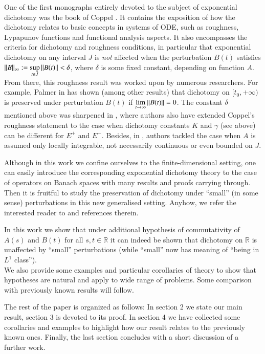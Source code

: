 \documentclass{elsarticle}
\theoremstyle{remark}
\begin{document}
 One of the first monographs entirely devoted to the subject of exponential dichotomy was the book of Coppel \cite{coppel1978dichotomies}.
 It contains the exposition of how the dichotomy relates to basic concepts in systems of ODE, such as
roughness, Lypapunov functions and functional analysis aspects. It also encompasses the criteria for dichotomy and roughness
conditions, in particular that exponential dichotomy on any interval $J$ is \textit{not} affected when the perturbation $B(t)$
satisfies $\mynorm{B}_\infty:=\sup_{t\in J}\mynorm{B(t)}<\delta$, where $\delta$ is some fixed constant, depending on function $A$.
From there, this roughness result was worked upon by numerous researchers. For example, Palmer in
\cite{palmer1984exponential} has shown (among other results) that dichotomy on $[t_0,+\infty)$ is preserved under perturbation
$B(t)$ if $\lim_{t\to\infty}\mynorm{B(t)}=0$. The constant $\delta$ mentioned above was sharpened in
\cite{Naulin1998559}, where authors also have extended Coppel's roughness statement to the case when dichotomy constants
$K$ and $\gamma$ (see above) can be different for $E^+$ and $E^-$. Besides, in \cite{Ju200139}, authors tackled the case when
$A$ is assumed only locally integrable, not necessarily continuous or even bounded on $J$.

Although in this work we confine ourselves to the finite-dimensional setting, one can easily introduce the corresponding
exponential dichotomy theory to the case of operators on Banach spaces with many results and proofs carrying through. Then it
is fruitful to study the preservation of dichotomy under ``small'' (in some sense) perturbations in this new generalised setting.
Anyhow, we refer the interested reader to \cite{Popescu2006436,lupamegan,barreira2011smooth} and references therein.

In this work we show that under additional hypothesis of commutativity of $A(s)$ and $B(t)$ for all $s,t\in\mathbb{R}$
it can indeed be shown that dichotomy on $\mathbb{R}$ is unaffected by ``small'' perturbations (while ``small'' now
has meaning of ``being in $L^1$ class'').\\
We also provide some examples and particular corollaries of theory to show that hypotheses are natural and apply to wide
range of problems. Some comparison with previously known results will follow.

The rest of the paper is organized as follows: In section 2 we state our main result, section 3 is devoted to its proof.
In section 4 we have collected some corollaries and examples to highlight how our result relates to the previously known ones.
Finally, the last section concludes with a short discussion of a further work.
\end{document}
